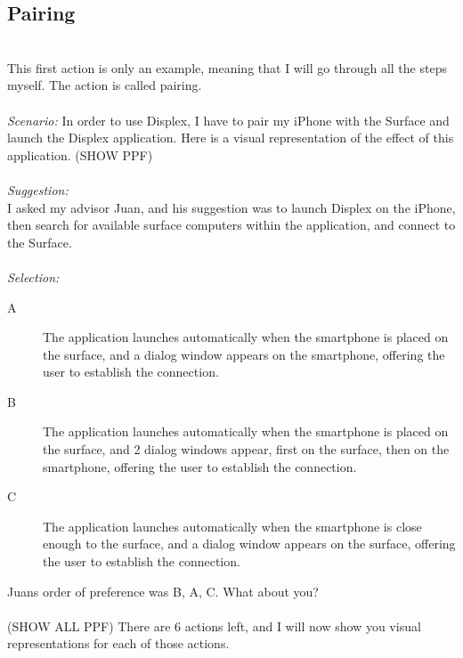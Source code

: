 \subsection{Pairing}
\hfill\\
This first action is only an example, meaning that I will go through all the steps myself.
The action is called pairing.
\\\\
\emph{Scenario:}
In order to use Displex, I have to pair my iPhone with the Surface and launch the Displex application.
Here is a visual representation of the effect of this application.
(SHOW PPF)
\\\\
\emph{Suggestion:}\\
I asked my advisor Juan, and his suggestion was to launch Displex on the iPhone, then search for available surface computers within the application,  and connect to the Surface.
\\\\
\emph{Selection:}
\begin{description}
\item[A]{The application launches automatically when the smartphone is placed on the surface, and a dialog window appears on the smartphone, offering the user to establish the connection.}
\item[B]{The application launches automatically when the smartphone is placed on the surface, and 2 dialog windows appear, first on the surface, then on the smartphone, offering the user to establish the connection.}
\item[C]{The application launches automatically when the smartphone is close enough to the surface, and a dialog window appears on the surface, offering the user to establish the connection.}
\end{description}

Juans order of preference was B, A, C.
What about you?
\\\\
(SHOW ALL PPF)
There are 6 actions left, and I will now show you visual representations for each of those actions.


